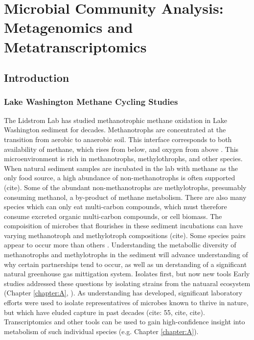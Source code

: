 \chapter{Microbial Community Analysis: Metagenomics and Metatranscriptomics}
\label{chapter:B}

\section{Introduction}
\subsection{Lake Washington Methane Cycling Studies}

The Lidstrom Lab has studied methanotrophic methane oxidation in Lake Washington sediment for decades.
Methanotrophs are concentrated at the transition from aerobic to anaerobic soil.
This interface corresponds to both availability of methane, which rises from below, and oxygen from above \cite{lidstrom1984gradients, kuivilal1988gradients,auman2000gradients}. %
This microenvironment is rich in methanotrophs, methylothrophs, and other species.
When natural sediment samples are incubated in the lab with methane as the only food source, a high abundance of non-methanotrophs is often supported (cite).
Some of the abundant non-methanotrophs are methylotrophs, presumably consuming methanol, a by-product of methane metabolism.
There are also many species which can only eat multi-carbon compounds, which must therefore consume excreted organic multi-carbon compounds, or cell biomass.
The compoisition of microbes that flourishes in these sediment incubations can have varying methanotroph and methylotroph compositions (cite).
Some species pairs appear to occur more than others \cite{oshkin2015LW}.
Understanding the metabollic diversity of methanotrophs and methylotrophs in the sediment will advance understanding of why certain partnerships tend to occur, as well as un derstanding of a significant natural greenhouse gas mittigation system.
Isolates first, but now new tools
Early studies addressed these questions by isolating strains from the natuaral ecosystem (Chapter \ref{chapter:A}, \cite{auman2000gradients}).
As understanding has developed, significant laboratory efforts were used to isolate representatives of microbes known to thrive in nature, but which have eluded capture in past decades (cite: 55, cite, cite).  %
Transcriptomics and other tools can be used to gain high-confidence insight into metabolism of such individual species (e.g. Chapter \ref{chapter:A}).
